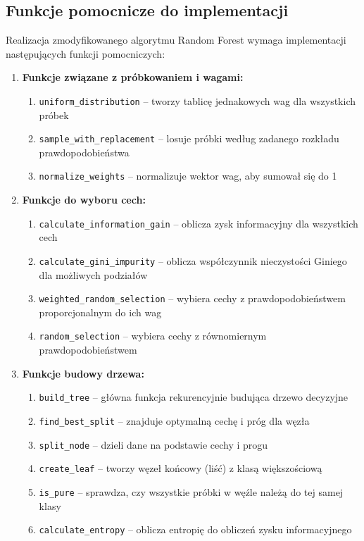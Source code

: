 \documentclass[12pt,a4paper]{article}
\begin{document}
\subsection{Funkcje pomocnicze do implementacji}

Realizacja zmodyfikowanego algorytmu Random Forest wymaga implementacji następujących funkcji pomocniczych:

\begin{enumerate}
    \item \textbf{Funkcje związane z próbkowaniem i wagami:}
    \begin{enumerate}
        \item \texttt{uniform\_distribution} -- tworzy tablicę jednakowych wag dla wszystkich próbek
        \item \texttt{sample\_with\_replacement} -- losuje próbki według zadanego rozkładu prawdopodobieństwa
        \item \texttt{normalize\_weights} -- normalizuje wektor wag, aby sumował się do 1
    \end{enumerate}

    \item \textbf{Funkcje do wyboru cech:}
    \begin{enumerate}
        \item \texttt{calculate\_information\_gain} -- oblicza zysk informacyjny dla wszystkich cech
        \item \texttt{calculate\_gini\_impurity} -- oblicza współczynnik nieczystości Giniego dla możliwych podziałów
        \item \texttt{weighted\_random\_selection} -- wybiera cechy z prawdopodobieństwem proporcjonalnym do ich wag
        \item \texttt{random\_selection} -- wybiera cechy z równomiernym prawdopodobieństwem
    \end{enumerate}

    \item \textbf{Funkcje budowy drzewa:}
    \begin{enumerate}
        \item \texttt{build\_tree} -- główna funkcja rekurencyjnie budująca drzewo decyzyjne
        \item \texttt{find\_best\_split} -- znajduje optymalną cechę i próg dla węzła
        \item \texttt{split\_node} -- dzieli dane na podstawie cechy i progu
        \item \texttt{create\_leaf} -- tworzy węzeł końcowy (liść) z klasą większościową
        \item \texttt{is\_pure} -- sprawdza, czy wszystkie próbki w węźle należą do tej samej klasy
        \item \texttt{calculate\_entropy} -- oblicza entropię do obliczeń zysku informacyjnego
    \end{enumerate}


\end{enumerate}
\end{document}
